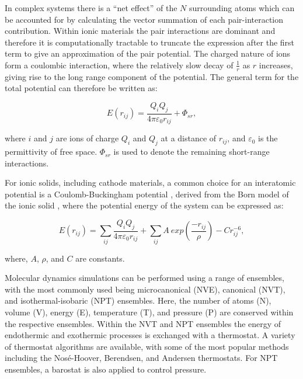\documentclass[../main.tex]{subfiles}
\begin{document}
In complex systems there is a ``net effect'' of the $N$ surrounding atoms which can be accounted for by calculating the vector summation of each pair-interaction contribution. Within ionic materials the pair interactions are dominant and therefore it is computationally tractable to truncate the expression after the first term \cite{harding_computer_1990} to give an approximation of the pair potential. The charged nature of ions form a coulombic interaction, where the relatively slow decay of $\frac{1}{r}$ as $r$ increases, giving rise to the long range component of the potential. The general term for the total potential can therefore be written as:

\begin{equation}
    E(r_{ij}) = \frac{Q_i Q_j}{4\pi \varepsilon_0 r_{ij}} + \Phi_{sr},
\end{equation}

where $i$ and $j$ are ions of charge $Q_i$ and $Q_j$ at a distance of $r_{ij}$, and $\varepsilon_0$ is the permittivity of free space. $\Phi_{sr}$ is used to denote the remaining short-range interactions.

For ionic solids, including cathode materials, a common choice for an interatomic potential is a Coulomb-Buckingham potential \cite{buckingham_classical_1938}, derived from the Born model of the ionic solid \cite{born_1932, mayer_1932}, where the potential energy of the system can be expressed as:

\begin{equation}
    E(r_{ij}) =  \sum_{ij} \frac{Q_i Q_j}{4\pi \varepsilon_0 r_{ij}} + \sum_{ij} A \ exp(\frac{-r_{ij}}{\rho}) - Cr_{ij}^{-6},
    \label{eqn:buckingham}
\end{equation}

where, $A$, $\rho$, and $C$ are constants.

Molecular dynamics simulations can be performed using a range of ensembles, with the most commonly used being microcanonical (NVE), canonical (NVT), and isothermal-isobaric (NPT) ensembles. \cite{todorov2006dl_poly_3, PLIMPTON19951, gale_gulp_1997} Here, the number of atoms (N), volume (V), energy (E), temperature (T), and pressure (P) are conserved within the respective ensembles. Within the NVT and NPT ensembles the energy of endothermic and exothermic processes is exchanged with a thermostat. A variety of thermostat algorithms are available, with some of the most popular methods including the Nos\'{e}-Hoover, Berendsen, and Andersen thermostats. \cite{todorov2006dl_poly_3, PLIMPTON19951, gale_gulp_1997} For NPT ensembles, a barostat is also applied to control pressure.
\end{document}
